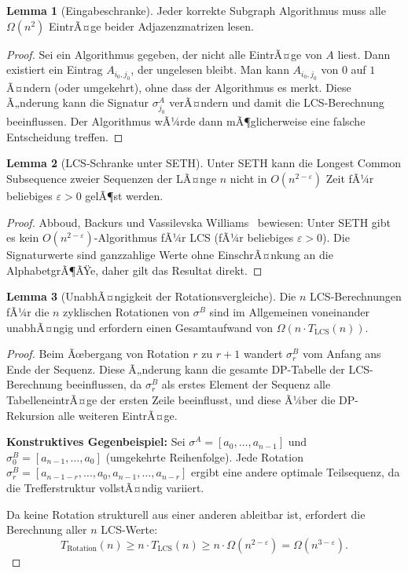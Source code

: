 ﻿\documentclass[a4paper,12pt]{article}
\theoremstyle{definition}
\newtheorem{lemma}{Lemma}
\begin{document}
\begin{lemma}[Eingabeschranke]
\label{lem:eingabe}
Jeder korrekte Subgraph Algorithmus muss alle $\Omega(n^2)$ EintrÃ¤ge beider
Adjazenzmatrizen lesen.
\end{lemma}

\begin{proof}
Sei ein Algorithmus gegeben, der nicht alle EintrÃ¤ge von $A$ liest. Dann existiert
ein Eintrag $A_{i_0,j_0}$, der ungelesen bleibt. Man kann $A_{i_0,j_0}$ von $0$ auf
$1$ Ã¤ndern (oder umgekehrt), ohne dass der Algorithmus es merkt. Diese Ã„nderung kann
die Signatur $\sigma_{j_0}^A$ verÃ¤ndern und damit die LCS-Berechnung beeinflussen.
Der Algorithmus wÃ¼rde dann mÃ¶glicherweise eine falsche Entscheidung treffen.
\end{proof}

\begin{lemma}[LCS-Schranke unter SETH]
\label{lem:lcs}
Unter SETH kann die Longest Common Subsequence zweier Sequenzen der LÃ¤nge $n$
nicht in $O(n^{2-\varepsilon})$ Zeit fÃ¼r beliebiges $\varepsilon > 0$ gelÃ¶st werden.
\end{lemma}

\begin{proof}
Abboud, Backurs und Vassilevska Williams~\cite{abboud2015} bewiesen: Unter SETH gibt
es kein $O(n^{2-\varepsilon})$-Algorithmus fÃ¼r LCS (fÃ¼r beliebiges $\varepsilon > 0$).
Die Signaturwerte sind ganzzahlige Werte ohne EinschrÃ¤nkung an die AlphabetgrÃ¶ÃŸe, daher
gilt das Resultat direkt.
\end{proof}

\begin{lemma}[UnabhÃ¤ngigkeit der Rotationsvergleiche]
\label{lem:unabhaengigkeit}
Die $n$ LCS-Berechnungen fÃ¼r die $n$ zyklischen Rotationen von $\sigma^B$ sind
im Allgemeinen voneinander unabhÃ¤ngig und erfordern einen Gesamtaufwand von
$\Omega(n \cdot T_{\mathrm{LCS}}(n))$.
\end{lemma}

\begin{proof}
Beim Ãœbergang von Rotation $r$ zu $r+1$ wandert $\sigma_r^B$ vom Anfang ans Ende
der Sequenz. Diese Ã„nderung kann die gesamte DP-Tabelle der LCS-Berechnung beeinflussen,
da $\sigma_r^B$ als erstes Element der Sequenz alle TabelleneintrÃ¤ge der ersten Zeile
beeinflusst, und diese Ã¼ber die DP-Rekursion alle weiteren EintrÃ¤ge.

\textbf{Konstruktives Gegenbeispiel:} Sei $\sigma^A = [a_0,\ldots,a_{n-1}]$ und
$\sigma^B_0 = [a_{n-1},\ldots,a_0]$ (umgekehrte Reihenfolge). Jede Rotation
$\sigma^B_r = [a_{n-1-r},\ldots,a_0,a_{n-1},\ldots,a_{n-r}]$ ergibt eine andere
optimale Teilsequenz, da die Trefferstruktur vollstÃ¤ndig variiert.

Da keine Rotation strukturell aus einer anderen ableitbar ist, erfordert die Berechnung
aller $n$ LCS-Werte:
\[
  T_{\text{Rotation}}(n) \geq n \cdot T_{\mathrm{LCS}}(n)
  \geq n \cdot \Omega(n^{2-\varepsilon}) = \Omega(n^{3-\varepsilon}).
\]
\end{proof}
\end{document}

